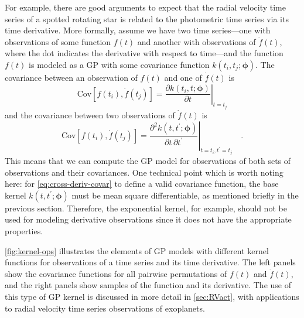 \documentclass[letterpaper]{ar-1col}
\newcommand{\hyperparams}{\ensuremath{\boldsymbol{\phi}}}
\begin{document}
For example, there are good arguments \citep{2012MNRAS.419.3147A} to expect that the radial velocity time series of a spotted rotating star is related to the photometric time series via its time derivative.
More formally, assume we have two time series---one with observations of some function $f(t)$ and another with observations of $\dot{f}(t)$, where the dot indicates the derivative with respect to time---and the function $f(t)$ is modeled as a GP with some covariance function $k(t_i,t_j;\hyperparams)$. The covariance between an observation of $f(t)$ and one of $\dot{f}(t)$ is
\begin{equation}
  \mathrm{Cov}\left[f(t_i),\dot{f}(t_j)\right] = \left.\frac{\partial k(t_i,t;\hyperparams)}{\partial t}\right|_{t=t_j}
\end{equation}
and the covariance between two observations of $\dot{f}(t)$ is
\begin{equation}
  \label{eq:cross-deriv-covar}
  \mathrm{Cov}\left[f(t_i),\dot{f}(t_j)\right] = \left.\frac{\partial^2 k(t,t^\prime;\hyperparams)}{\partial t\,\partial t^\prime}\right|_{t=t_i,t^\prime=t_j} \quad.
\end{equation}
This means that we can compute the GP model for observations of both sets of observations and their covariances.
One technical point which is worth noting here: for \autoref{eq:cross-deriv-covar} to define a valid covariance function, the base kernel $k(t,t^\prime;\hyperparams)$ must be mean square differentiable, as mentioned briefly in the previous section.
Therefore, the exponential kernel, for example, should not be used for modeling derivative observations since it does not have the appropriate properties.

\autoref{fig:kernel-ops} illustrates the elements of GP models with different kernel functions for observations of a time series and its time derivative.
The left panels show the covariance functions for all pairwise permutations of $f(t)$ and $\dot{f}(t)$, and the right panels show samples of the function and its derivative.
The use of this type of GP kernel is discussed in more detail in \autoref{sec:RVact}, with applications to radial velocity time series observations of exoplanets.
\end{document}

